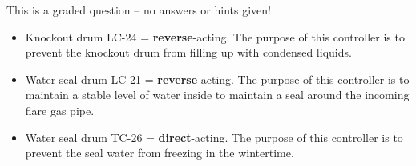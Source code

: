 \vfil 

\eject






This is a graded question -- no answers or hints given!







\begin{itemize}
\item{} Knockout drum LC-24 = {\bf reverse}-acting.  The purpose of this controller is to prevent the knockout drum from filling up with condensed liquids.
\vskip 5pt
\item{} Water seal drum LC-21 = {\bf reverse}-acting.  The purpose of this controller is to maintain a stable level of water inside to maintain a seal around the incoming flare gas pipe.
\vskip 5pt
\item{} Water seal drum TC-26 = {\bf direct}-acting.  The purpose of this controller is to prevent the seal water from freezing in the wintertime.
\end{itemize}



